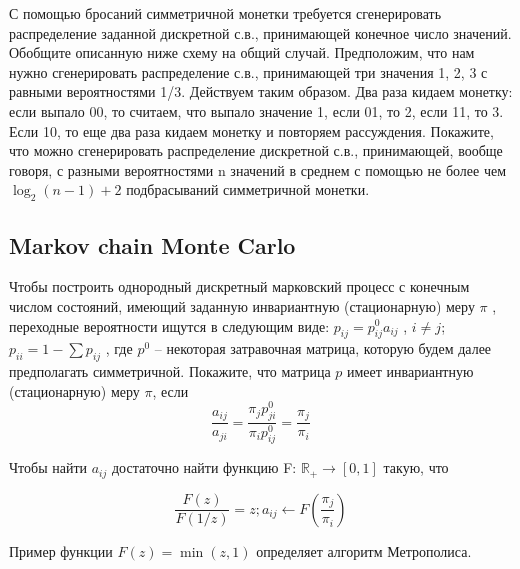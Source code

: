 \begin{problem}
С помощью бросаний симметричной монетки требуется сгенерировать распределение заданной дискретной с.в., принимающей конечное число значений. Обобщите описанную ниже схему на общий случай. Предположим, что нам нужно сгенерировать распределение с.в., принимающей три значения 1, 2, 3 с равными вероятностями 1/3. Действуем таким образом. Два раза кидаем монетку: если выпало 00, то считаем, что выпало значение 1, если 01, то 2, если 11, то 3. Если 10, то еще два раза кидаем монетку и повторяем рассуждения. Покажите, что можно сгенерировать распределение дискретной с.в., принимающей, вообще говоря, с разными вероятностями n значений в среднем с помощью не более чем $\log_2 (n - 1) + 2$ подбрасываний симметричной монетки.
\end{problem}

\subsection{ Markov chain Monte Carlo }

\begin{problem}
Чтобы построить однородный дискретный марковский процесс с конечным числом состояний, имеющий заданную инвариантную (стационарную) меру $\pi$ , переходные вероятности ищутся в следующим виде: $p_{ij} = p_{ij}^0 a_{ij}$ , 
$i \neq j$; $p_{ii} = 1 - \sum p_{ij}$ , где $p^0$ – некоторая затравочная матрица, которую будем далее предполагать симметричной. Покажите, что матрица $p$ имеет инвариантную (стационарную) меру  $\pi$, если
\[
\frac{a_{ij}}{a_{ji}} = \frac{\pi_{j} p^0_{ji}}{\pi_{i} p^0_{ij}} = \frac{\pi_{j}}{\pi_{i}} 
\]

Чтобы найти  $a_{ij}$ достаточно найти функцию F: $\mathbb{R_+} \rightarrow [0,1]$ такую, что

\[
\frac{F(z)}{F(1/z)} = z; a_{ij}  \leftarrow F( \frac{\pi_{j}}{\pi_{i}} )
\]

Пример функции $F(z) = \min(z,1)$ определяет алгоритм Метрополиса. 

\end{problem}

